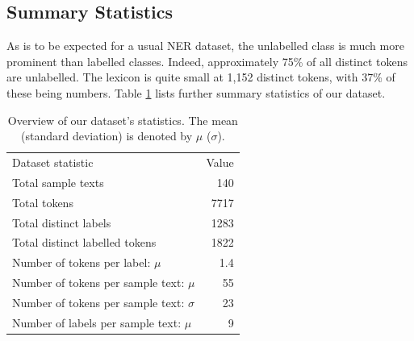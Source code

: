 \documentclass[11pt]{article}
\begin{document}
\subsection{Summary Statistics}

As is to be expected for a usual NER dataset, the unlabelled class is much more prominent than labelled classes. Indeed, approximately 75\% of all distinct tokens are unlabelled. The lexicon is quite small at 1,152 distinct tokens, with 37\% of these being numbers. Table \ref{datstat} lists further summary statistics of our dataset.

\begin{table}[h]
\centering
\caption{Overview of our dataset's statistics. The mean (standard deviation) is denoted by $\mu$ ($\sigma$).}
\label{datstat}
\begin{tabular}{|l|r|}
\hline
Dataset statistic & Value\\
\hhline{|=|=|}
Total sample texts & 140\\
\hline
Total tokens & 7717\\
\hline
Total distinct labels & 1283\\
\hline
Total distinct labelled tokens & 1822\\
\hline
Number of tokens per label: $\mu$ & 1.4\\
\hline
Number of tokens per sample text: $\mu$ & 55\\
\hline
Number of tokens per sample text: $\sigma$ & 23\\
\hline
Number of labels per sample text: $\mu$ & 9\\
\hline
\end{tabular}
\end{table}

\end{document}
